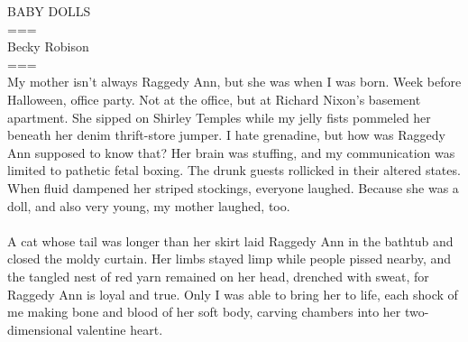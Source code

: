 \documentclass[11pt]{article}
\begin{document}
\noindent BABY DOLLS\\
===\\
Becky Robison\\
===\\
My mother isn’t always Raggedy Ann, but she was when I was born. Week before Halloween, office party. Not at the office, but at Richard Nixon’s basement apartment. She sipped on Shirley Temples while my jelly fists pommeled her beneath her denim thrift-store jumper. I hate grenadine, but how was Raggedy Ann supposed to know that? Her brain was stuffing, and my communication was limited to pathetic fetal boxing. The drunk guests rollicked in their altered states. When fluid dampened her striped stockings, everyone laughed. Because she was a doll, and also very young, my mother laughed, too.\\
\\
A cat whose tail was longer than her skirt laid Raggedy Ann in the bathtub and closed the moldy curtain. Her limbs stayed limp while people pissed nearby, and the tangled nest of red yarn remained on her head, drenched with sweat, for Raggedy Ann is loyal and true. Only I was able to bring her to life, each shock of me making bone and blood of her soft body, carving chambers into her two-dimensional valentine heart.
\end{document}
